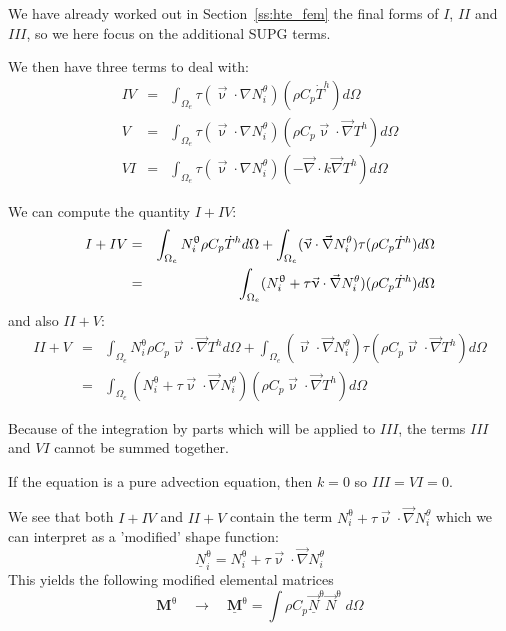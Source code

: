 We have already worked out in Section~\ref{ss:hte_fem} the final forms of $I$, $II$ and 
$III$, so we here focus on the additional SUPG terms. 
  
We then have three terms to deal with:
\begin{eqnarray}
IV &=&\int_{\Omega_e} \tau(\vec\upnu\cdot\nabla N_i^\theta) (\rho C_p\dot{T}^h)  d\Omega \\
V  &=&\int_{\Omega_e} \tau(\vec\upnu\cdot\nabla N_i^\theta)(\rho C_p{\vec \upnu}\cdot{\vec\nabla T^h}) d\Omega \\
VI &=&\int_{\Omega_e} \tau(\vec\upnu\cdot\nabla N_i^\theta)(-{\vec \nabla} \cdot k \vec\nabla T^h ) d\Omega 
\end{eqnarray}

We can compute the quantity $I+IV$:
\begin{eqnarray}
I+IV 
&=&
\int_{\Omega_e} N^\uptheta_i  \rho C_p \dot{T}^h d\Omega 
+
\int_{\Omega_e}(\vec\upnu\cdot\vec\nabla N_i^\theta)  \tau ( \rho C_p\dot{T}^h)  d\Omega \nonumber\\
&=& 
\int_{\Omega_e} ( N^\uptheta_i + \tau \vec\upnu\cdot\vec\nabla N_i^\theta )  ( \rho C_p\dot{T}^h)  d\Omega 
\end{eqnarray}
and also $II+V$:
\begin{eqnarray}
II+V 
&=&
\int_{\Omega_e} N^\uptheta_i  \rho C_p  {\vec \upnu}\cdot {\vec\nabla T^h}   d\Omega
+
\int_{\Omega_e}(\vec\upnu\cdot\vec\nabla N_i^\theta) \tau (\rho C_p {\vec \upnu}\cdot{\vec\nabla T^h}) d\Omega \\
&=& 
\int_{\Omega_e} (N^\uptheta_i  + \tau \vec\upnu\cdot\vec\nabla N_i^\theta) (\rho C_p {\vec \upnu}\cdot{\vec\nabla T^h}) d\Omega 
\end{eqnarray}

\begin{remark} Because of the integration by parts which 
will be applied to  $III$, the terms $III$ and $VI$ cannot be summed together.
\end{remark}


\begin{remark}
If the equation is a pure advection equation, then $k=0$ so $III=VI=0$. 
\end{remark}


We see that both $I+IV$ and $II+V$ contain the term $N^\uptheta_i  + \tau \vec\upnu\cdot\vec\nabla N_i^\theta$
which we can interpret as a 'modified' shape function:
\[
\boxed{
\underline{N}^\uptheta_i = N^\uptheta_i  + \tau \vec\upnu\cdot\vec\nabla N_i^\theta
}
\]
This yields the following modified elemental matrices
\[
{\bm M}^\uptheta \quad \rightarrow \quad \underline{\bm M}^\uptheta
= \int \rho C_p \vec{\underline{N}}^\uptheta \vec{N}^\uptheta \; d\Omega
\]

